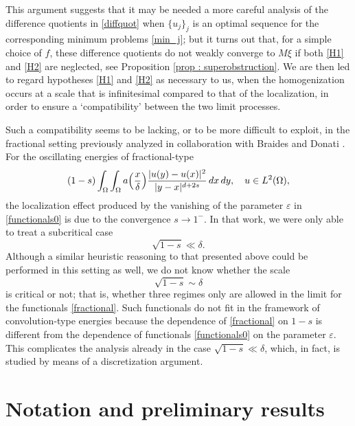 \documentclass{article}
\theoremstyle{definition}
\newcommand{\e}{\varepsilon}
\begin{document}
This argument suggests that it may be needed a more careful analysis of the difference quotients in \eqref{diffquot}  when $\{u_j\}_j$ is an optimal sequence for the corresponding minimum problems \eqref{min_j}; but it turns out that, for a simple choice of $f$, these difference quotients do not weakly converge to $M\xi$ if both \eqref{H1} and \eqref{H2} are neglected, see Proposition \ref{prop : superobstruction}. We are then led to regard hypotheses \eqref{H1} and \eqref{H2} as necessary to us, when the homogenization occurs at a scale that is infinitesimal compared to that of the localization, in order to ensure a `compatibility' between the two limit processes.

\smallskip

Such a compatibility seems to be lacking, or to be more difficult to exploit, in the fractional setting previously analyzed in collaboration with Braides and Donati \cite{BBD}. For the oscillating energies of fractional-type 
\begin{equation}\label{fractional}
     (1-s)\int_\Omega\int_\Omega a\Bigl(\frac{x}{\delta}\Bigr)\frac{|u(y)-u(x)|^2}{|y-x|^{d+2s}}\, dx\,dy, \quad u\in L^2(\Omega), 
\end{equation}
the localization effect produced by the vanishing of the parameter $\e$ in \eqref{functionals0} is due to the convergence $s\to 1^-$. In that work, we were only able to treat a subcritical case
\begin{equation*}
    \sqrt{1-s} \ll \delta.
\end{equation*}
Although a similar heuristic reasoning to that presented above could be performed in this setting as well, we do not know whether the scale 
\begin{equation*}
    \sqrt{1-s} \sim \delta
\end{equation*}
is critical or not; that is, whether three regimes only are allowed in the limit for the functionals \eqref{fractional}. Such functionals do not fit in the framework of convolution-type energies because the dependence of \eqref{fractional} on $1-s$ is different from the dependence of functionals \eqref{functionals0} on the parameter $\e$. This complicates the analysis already in the case $\sqrt{1-s} \ll \delta$, which, in fact, is studied by means of a discretization argument.


\section{Notation and preliminary results}
\end{document}
